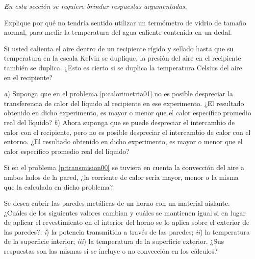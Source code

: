 \textit{En esta sección se requiere brindar respuestas argumentadas.}
\setcounter{figure}{0}
%
\begin{Exercise}
  Explique por qué no tendría sentido utilizar un termómetro de vidrio de tamaño normal, para medir la temperatura del agua caliente contenida en un dedal.
\end{Exercise}
%
\begin{Exercise}
  Si usted calienta el aire dentro de un recipiente rígido y sellado hasta que su temperatura en la escala Kelvin se duplique, la presión del aire en el recipiente también se duplica. ¿Esto es cierto si se duplica la temperatura Celsius del aire en el recipiente?
\end{Exercise}
%
\begin{Exercise}
  \textit{a}) Suponga que en el problema \ref{p:calorimetria01} no es posible despreciar la transferencia de calor del líquido al recipiente en ese experimento. ¿El resultado obtenido en dicho experimento, es mayor o menor que el calor específico promedio real del líquido? \textit{b}) Ahora suponga que se puede despreciar el intercambio de calor con el recipiente, pero no es posible despreciar el intercambio de calor con el entorno. ¿El resultado obtenido en dicho experimento, es mayor o menor que el calor específico promedio real del líquido?
\end{Exercise}
%
\begin{Exercise}
  Si en el problema \ref{p:transmision00} se tuviera en cuenta la convección del aire a ambos lados de la pared, ¿la corriente de calor sería mayor, menor o la misma que la calculada en dicho problema?
\end{Exercise}
%
\begin{Exercise}
  Se desea cubrir las paredes metálicas de un horno con un material aislante. ¿Cuáles de los siguientes valores cambian y cuáles se mantienen igual si en lugar de aplicar el revestimiento en el interior del horno se lo aplica sobre el exterior de las paredes?: \textit{i}) la potencia transmitida a través de las paredes; \textit{ii}) la temperatura de la superficie interior; \textit{iii}) la temperatura de la superficie exterior. ¿Sus respuestas son las mismas si se incluye o no convección en los cálculos?
\end{Exercise}
%
